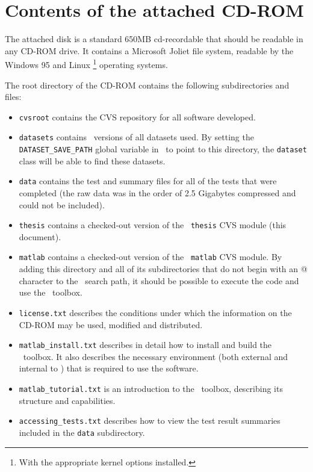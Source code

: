 
\chapter{Contents of the attached CD-ROM}
\label{appendix:cdrom}

The attached disk is a standard 650MB cd-recordable that should be
readable in any CD-ROM drive.  It contains a Microsoft Joliet file
system, readable by the Windows 95 and Linux%
\footnote{With the appropriate kernel options installed.}
operating systems.

The root directory of the CD-ROM contains the following subdirectories
and files:
%
\begin{itemize}
\item	{\tt cvsroot} contains the CVS repository for all software
	developed.
\item	{\tt datasets} contains \MATLAB\ versions of all datasets
	used.  By setting the {\tt DATASET\_SAVE\_PATH} global variable
	in \MATLAB\ to point to this directory, the {\tt dataset}
	class will be able to find these datasets.
\item	{\tt data} contains the test and summary files for all of the
	tests that were completed (the raw data was in the order of
	2.5 Gigabytes compressed and could not be included).
\item	{\tt thesis} contains a checked-out version of the {\tt
	thesis} CVS module (this document).
\item	{\tt matlab} contains a checked-out version of the {\tt
	matlab} CVS module.  By adding this directory and all of its
	subdirectories that do not begin with an @ character to the
	\MATLAB\ search path, it should be possible to execute the
	code and use the \MATLAB\ toolbox.
\item	{\tt license.txt} describes the conditions under which the
	information on the CD-ROM may be used, modified and
	distributed.
\item	{\tt matlab\_install.txt} describes in detail how to install
	and build the \MATLAB\ toolbox.  It also describes the
	necessary environment (both external and internal to \MATLAB)
	that is required to use the software.
\item	{\tt matlab\_tutorial.txt} is an introduction to the \MATLAB\
	toolbox, describing its structure and capabilities.
\item	{\tt accessing\_tests.txt} describes how to view the test
	result summaries included in the {\tt data} subdirectory.
\end{itemize}

